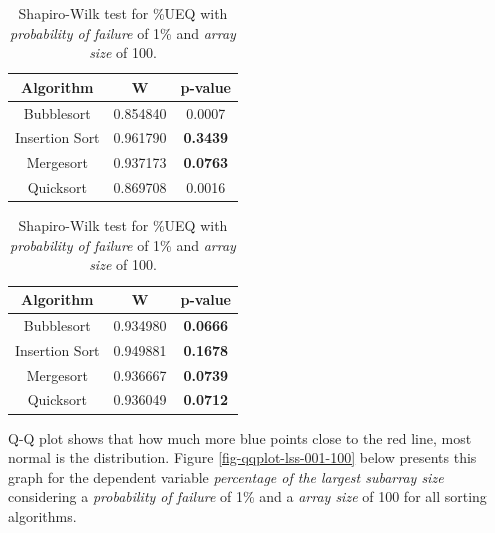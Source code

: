 \begin{table}[H]
    \parbox{.45\linewidth}{
        \caption{Shapiro-Wilk test for \%LSS with \textit{probability of failure} of 1\% and \textit{array size} of 100.}
        \begin{center}
        \begin{tabular}{|c|c|c|}
        \hline
        \textbf{Algorithm} & \textbf{W} & \textbf{p-value} \\
        \hline
        Bubblesort & 0.854840 & 0.0007 \\
        \hline
        Insertion Sort & 0.961790 & \textbf{0.3439} \\
        \hline
        Mergesort & 0.937173 & \textbf{0.0763} \\
        \hline
        Quicksort & 0.869708 & 0.0016 \\
        \hline
        \end{tabular}
        \label{table-shapiro-test-lss-001-100}
        \end{center}
    }
    \hfill
    \parbox{.45\linewidth}{
        \caption{Shapiro-Wilk test for \%UEQ with \textit{probability of failure} of 1\% and \textit{array size} of 100.}
        \begin{center}
        \begin{tabular}{|c|c|c|}
        \hline
        \textbf{Algorithm} & \textbf{W} & \textbf{p-value} \\
        \hline
        Bubblesort & 0.934980 & \textbf{0.0666} \\
        \hline
        Insertion Sort & 0.949881 & \textbf{0.1678} \\
        \hline
        Mergesort & 0.936667 & \textbf{0.0739} \\
        \hline
        Quicksort & 0.936049 & \textbf{0.0712} \\
        \hline
        \end{tabular}
        \label{table-shapiro-test-ueq-001-100}
        \end{center}
    }
\end{table}

Q-Q plot shows that how much more blue points close to the red line, most normal is the distribution. Figure \ref{fig-qqplot-lss-001-100} below presents this graph for the dependent variable \textit{percentage of the largest subarray size} considering a \textit{probability of failure} of 1\% and a \textit{array size} of 100 for all sorting algorithms. 

